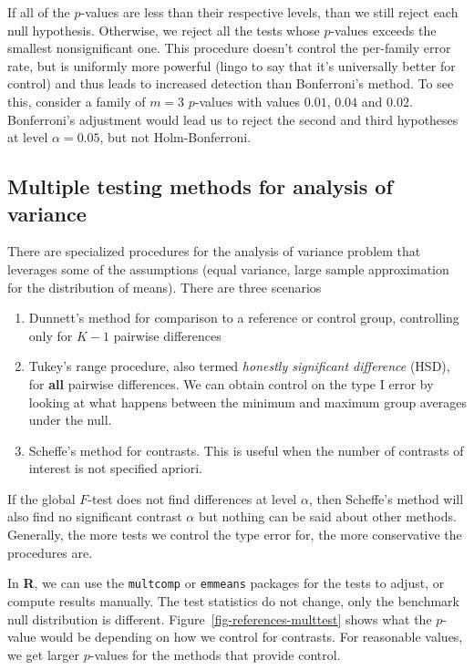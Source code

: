 \documentclass[
  11pt,
  letterpaper,
]{scrbook}
\providecommand{\tightlist}{%
  \setlength{\itemsep}{0pt}\setlength{\parskip}{0pt}}\usepackage{longtable,booktabs,array}
\theoremstyle{definition}
\theoremstyle{definition}
\theoremstyle{remark}
\begin{document}
If all of the \(p\)-values are less than their respective levels, than
we still reject each null hypothesis. Otherwise, we reject all the tests
whose \(p\)-values exceeds the smallest nonsignificant one. This
procedure doesn't control the per-family error rate, but is uniformly
more powerful (lingo to say that it's universally better for control)
and thus leads to increased detection than Bonferroni's method. To see
this, consider a family of \(m=3\) \(p\)-values with values \(0.01\),
\(0.04\) and \(0.02\). Bonferroni's adjustment would lead us to reject
the second and third hypotheses at level \(\alpha=0.05\), but not
Holm-Bonferroni.

\subsection{Multiple testing methods for analysis of
variance}\label{multiple-testing-methods-for-analysis-of-variance}

There are specialized procedures for the analysis of variance problem
that leverages some of the assumptions (equal variance, large sample
approximation for the distribution of means). There are three scenarios

\begin{enumerate}
\def\labelenumi{\arabic{enumi}.}
\tightlist
\item
  Dunnett's method for comparison to a reference or control group,
  controlling only for \(K-1\) pairwise differences
\item
  Tukey's range procedure, also termed \emph{honestly significant
  difference} (HSD), for \textbf{all} pairwise differences. We can
  obtain control on the type I error by looking at what happens between
  the minimum and maximum group averages under the null.
\item
  Scheffe's method for contrasts. This is useful when the number of
  contrasts of interest is not specified apriori.
\end{enumerate}

If the global \(F\)-test does not find differences at level \(\alpha\),
then Scheffe's method will also find no significant contrast \(\alpha\)
but nothing can be said about other methods. Generally, the more tests
we control the type error for, the more conservative the procedures are.

In \textbf{R}, we can use the \texttt{multcomp} or \texttt{emmeans}
packages for the tests to adjust, or compute results manually. The test
statistics do not change, only the benchmark null distribution is
different. Figure~\ref{fig-references-multtest} shows what the
\(p\)-value would be depending on how we control for contrasts. For
reasonable values, we get larger \(p\)-values for the methods that
provide control.
\end{document}
